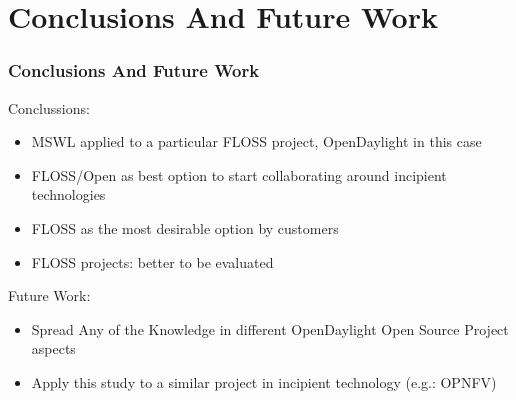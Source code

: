\section{Conclusions And Future Work}

\begin{frame}[allowframebreaks]
\frametitle{Conclusions And Future Work}

Conclussions:
\begin{itemize}
 \item MSWL applied to a particular FLOSS project, OpenDaylight in this case
 \item FLOSS/Open as best option to start collaborating around incipient technologies
 \item FLOSS as the most desirable option by customers
 \item FLOSS projects: better to be evaluated
\end{itemize}

Future Work:
\begin{itemize}
 \item Spread Any of the Knowledge in different OpenDaylight Open Source Project aspects
 \item Apply this study to a similar project in incipient technology (e.g.: OPNFV)
\end{itemize}

\end{frame}
